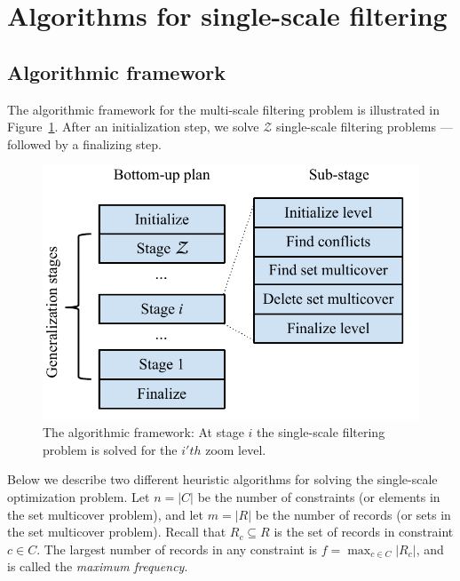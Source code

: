 \section{Algorithms for single-scale filtering}
\label{sec:algorithms}

\subsection{Algorithmic framework}

The algorithmic framework for the multi-scale filtering problem is illustrated in Figure~\ref{fig:algorithmic-framework}. After an initialization step, we solve $\mathcal{Z}$ single-scale filtering problems --- followed by a finalizing step.

\begin{figure}[htbp]
\begin{center}
\includegraphics[scale=.6]{figs/cvl_stages.pdf}
\caption{The algorithmic framework: At stage $i$ the single-scale filtering problem is solved for the $i'th$ zoom level.}
\label{fig:algorithmic-framework}
\end{center}
\end{figure}

Below we describe two different heuristic algorithms for solving the single-scale optimization problem. Let $n=|C|$ be the number of constraints (or elements in the set multicover problem), and let $m=|R|$ be the number of records (or sets in the set multicover problem). Recall that $R_c \subseteq R$ is the set of records in constraint $c \in C$. The largest number of records in any constraint is $f = \max_{c \in C} |R_c|$, and is called the \emph{maximum frequency}.

